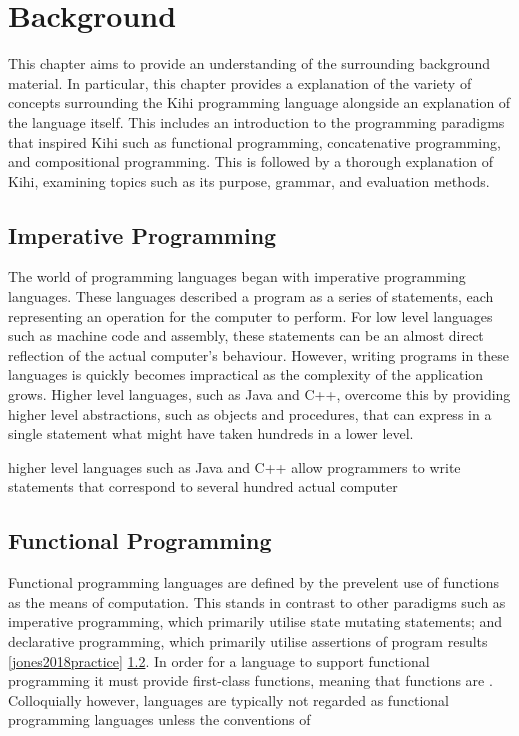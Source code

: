 \chapter{Background} \label{C:background}
This chapter aims to provide an understanding of the surrounding background material. In particular, this chapter provides a explanation of the variety of concepts surrounding the Kihi programming language alongside an explanation of the language itself. This includes an introduction to the programming paradigms that inspired Kihi such as functional programming, concatenative programming, and compositional programming. This is followed by a thorough explanation of Kihi, examining topics such as its purpose, grammar, and evaluation methods.

\section{Imperative Programming}
The world of programming languages began with imperative programming languages. These languages described a program as a series of statements, each representing an operation for the computer to perform. For low level languages such as machine code and assembly, these statements can be an almost direct reflection of the actual computer's behaviour. However, writing programs in these languages is quickly becomes impractical as the complexity of the application grows. Higher level languages, such as Java and C++, overcome this by providing higher level abstractions, such as objects and procedures, that can express in a single statement what might have taken hundreds in a lower level.

higher level languages such as Java and C++ allow programmers to write statements that correspond to several hundred actual computer


\section{Functional Programming}

Functional programming languages are defined by the prevelent use of functions as the means of computation. This stands in contrast to other paradigms such as imperative programming, which primarily utilise state mutating statements; and declarative programming, which primarily utilise assertions of program results \ref{jones2018practice} \ref{}. In order for a language to support functional programming it must provide first-class functions, meaning that functions are . Colloquially however, languages are typically not regarded as functional programming languages unless the conventions of

